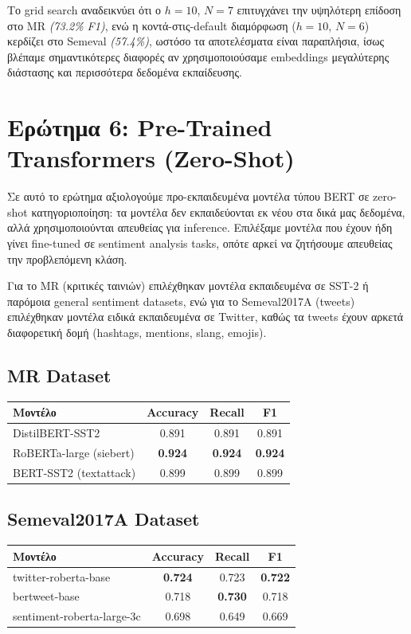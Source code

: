 \documentclass[12pt]{article}
\begin{document}
Το grid search αναδεικνύει ότι ο $h{=}10$, $N{=}7$ επιτυγχάνει την
υψηλότερη επίδοση στο MR \emph{(73.2\% F1)}, ενώ η κοντά-στις-default
διαμόρφωση ($h{=}10$, $N{=}6$) κερδίζει στο Semeval \emph{(57.4\%)}, ωστόσο τα αποτελέσματα είναι παραπλήσια, ίσως βλέπαμε σημαντικότερες διαφορές αν χρησιμοποιούσαμε embeddings μεγαλύτερης διάστασης και περισσότερα δεδομένα εκπαίδευσης.

\section{Ερώτημα 6: Pre-Trained Transformers (Zero-Shot)}

Σε αυτό το ερώτημα αξιολογούμε προ-εκπαιδευμένα μοντέλα τύπου BERT σε
zero-shot κατηγοριοποίηση: τα μοντέλα δεν εκπαιδεύονται εκ νέου στα
δικά μας δεδομένα, αλλά χρησιμοποιούνται απευθείας για inference.
Επιλέξαμε μοντέλα που έχουν ήδη γίνει fine-tuned σε sentiment analysis
tasks, οπότε αρκεί να ζητήσουμε απευθείας την προβλεπόμενη κλάση.

Για το MR (κριτικές ταινιών) επιλέχθηκαν μοντέλα εκπαιδευμένα σε
SST-2 ή παρόμοια general sentiment datasets, ενώ για το
Semeval2017A (tweets) επιλέχθηκαν μοντέλα ειδικά εκπαιδευμένα
σε Twitter, καθώς τα tweets έχουν αρκετά διαφορετική δομή (hashtags, mentions, slang, emojis).

\subsection{MR Dataset}

\begin{center}
\begin{tabular}{lccc}
\toprule
Μοντέλο & Accuracy & Recall & F1 \\
\midrule
DistilBERT-SST2 & 0.891 & 0.891 & 0.891 \\
RoBERTa-large (siebert) & \textbf{0.924} & \textbf{0.924} & \textbf{0.924} \\
BERT-SST2 (textattack) & 0.899 & 0.899 & 0.899 \\
\bottomrule
\end{tabular}
\end{center}

\subsection{Semeval2017A Dataset}

\begin{center}
\begin{tabular}{lccc}
\toprule
Μοντέλο & Accuracy & Recall & F1 \\
\midrule
twitter-roberta-base & \textbf{0.724} & 0.723 & \textbf{0.722} \\
bertweet-base & 0.718 & \textbf{0.730} & 0.718 \\
sentiment-roberta-large-3c & 0.698 & 0.649 & 0.669 \\
\bottomrule
\end{tabular}
\end{center}
\end{document}
